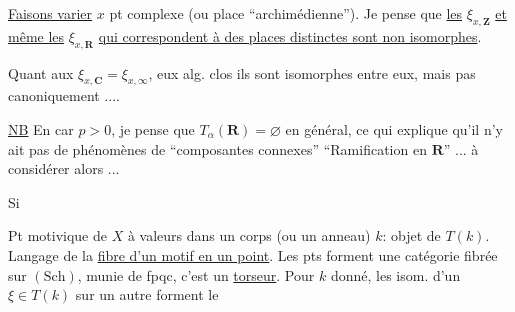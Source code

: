 \uline{Faisons varier} $x$ pt complexe (ou place ``archimédienne''). Je pense que \uline{les}
$\xi_{x,\mathbf Z}$ \uline{et même les} $\xi_{x,\mathbf R}$ 
\uline{qui correspondent à des places distinctes sont non isomorphes}.


Quant aux $\xi_{x,\mathbf C}=\xi_{x,\infty}$, eux 
alg. clos ils sont isomorphes entre eux, mais pas canoniquement ....

\uline{NB} En car $p>0$, je pense que $T_\alpha(\mathbf R)=\varnothing$
en général, ce qui explique qu'il n'y ait pas de phénomènes de
``composantes connexes'' ``Ramification en $\mathbf R$'' ...
à considérer alors ...


Si


Pt motivique de $X$ à valeurs dans un corps (ou un anneau) $k$: objet de $T(k)$.
Langage de la \uline{fibre d'un motif en un point}.
Les pts forment une catégorie fibrée sur $(\mathrm{Sch})$, munie de fpqc,
 c'est un \uline{torseur}.
Pour $k$ donné, les isom. d'un  $\xi\in T(k)$ sur un autre forment le

